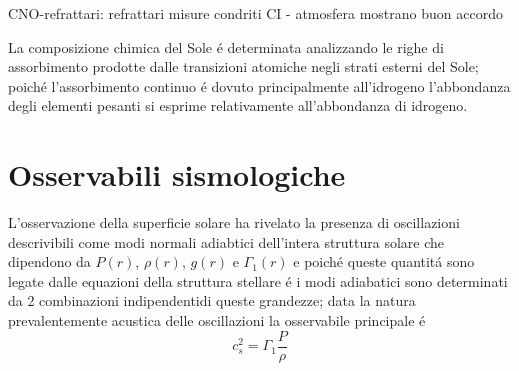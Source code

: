 \documentclass[../main.tex]{subfiles}
\begin{document}
\begin{workout}

CNO-refrattari: refrattari misure condriti CI - atmosfera mostrano buon accordo

\end{workout}

La composizione chimica del Sole \'e determinata analizzando le righe di assorbimento prodotte dalle transizioni atomiche negli strati esterni del Sole; poich\'e l'assorbimento continuo \'e dovuto principalmente all'idrogeno l'abbondanza degli elementi pesanti si esprime relativamente all'abbondanza di idrogeno.

\begin{table}[!h]


\end{table}


\section{Osservabili sismologiche}

L'osservazione della superficie solare ha rivelato la presenza di oscillazioni descrivibili come modi normali adiabtici dell'intera struttura solare che dipendono da $P(r)$, $\rho(r)$, $g(r)$ e $\Gamma_1(r)$ e poich\'e queste quantit\'a sono legate dalle equazioni della struttura stellare \'e i modi adiabatici sono determinati da 2 combinazioni indipendentidi queste grandezze; data la natura prevalentemente acustica delle oscillazioni la osservabile principale \'e
\begin{equation}
c_s^2=\Gamma_1\frac{P}{\rho}
\end{equation}
\end{document}
